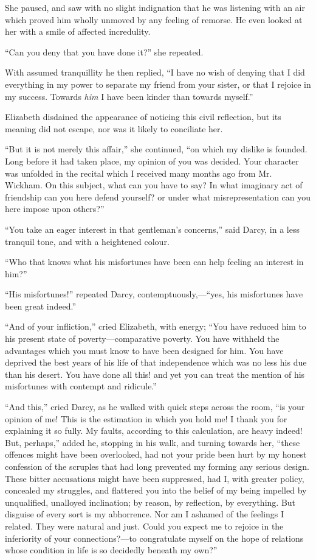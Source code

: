She paused, and saw with no slight indignation that he was listening with an air which proved him wholly unmoved by any feeling of remorse. He even looked at her with a smile of affected incredulity.

``Can you deny that you have done it?'' she repeated.

With assumed tranquillity he then replied, ``I have no wish of denying that I did everything in my power to separate my friend from your sister, or that I rejoice in my success. Towards \textit{him} I have been kinder than towards myself.''

Elizabeth disdained the appearance of noticing this civil reflection, but its meaning did not escape, nor was it likely to conciliate her.

``But it is not merely this affair,'' she continued, ``on which my dislike is founded. Long before it had taken place, my opinion of you was decided. Your character was unfolded in the recital which I received many months ago from Mr. Wickham. On this subject, what can you have to say? In what imaginary act of friendship can you here defend yourself? or under what misrepresentation can you here impose upon others?''

``You take an eager interest in that gentleman's concerns,'' said Darcy, in a less tranquil tone, and with a heightened colour.

``Who that knows what his misfortunes have been can help feeling an interest in him?''

``His misfortunes!'' repeated Darcy, contemptuously,---``yes, his misfortunes have been great indeed.''

``And of your infliction,'' cried Elizabeth, with energy; ``You have reduced him to his present state of poverty---comparative poverty. You have withheld the advantages which you must know to have been designed for him. You have deprived the best years of his life of that independence which was no less his due than his desert. You have done all this! and yet you can treat the mention of his misfortunes with contempt and ridicule.''

``And this,'' cried Darcy, as he walked with quick steps across the room, ``is your opinion of me! This is the estimation in which you hold me! I thank you for explaining it so fully. My faults, according to this calculation, are heavy indeed! But, perhaps,'' added he, stopping in his walk, and turning towards her, ``these offences might have been overlooked, had not your pride been hurt by my honest confession of the scruples that had long prevented my forming any serious design. These bitter accusations might have been suppressed, had I, with greater policy, concealed my struggles, and flattered you into the belief of my being impelled by unqualified, unalloyed inclination; by reason, by reflection, by everything. But disguise of every sort is my abhorrence. Nor am I ashamed of the feelings I related. They were natural and just. Could you expect me to rejoice in the inferiority of your connections?---to congratulate myself on the hope of relations whose condition in life is so decidedly beneath my own?''

